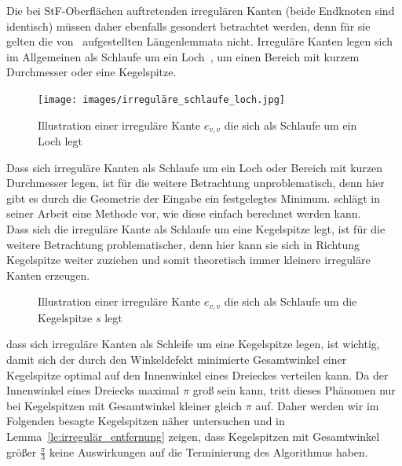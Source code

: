 Die bei StF-Oberflächen auftretenden irregulären Kanten (beide Endknoten sind identisch) müssen daher ebenfalls gesondert betrachtet werden, denn für sie gelten die von~\citet{ruppert:1995:delaunay} aufgestellten Längenlemmata nicht. Irreguläre Kanten legen sich im Allgemeinen als Schlaufe um ein Loch~\citeauthor{erickson:2005:generator}, um einen Bereich mit kurzem Durchmesser oder eine Kegelspitze.\\
 \begin{figure}[H]
    \centering
    \texttt{[image: images/irreguläre\_schlaufe\_loch.jpg]}
    \caption{Illustration einer  irreguläre Kante $e_{v,v}$ die sich als Schlaufe um ein Loch legt }%
    \label{fig:irreguläre_schlaufe}
\end{figure}
 


Dass sich irreguläre Kanten als Schlaufe um ein Loch oder Bereich mit kurzen Durchmesser legen, ist für die weitere Betrachtung unproblematisch, denn hier gibt es durch die Geometrie der Eingabe ein festgelegtes Minimum.  \citet{erickson:2005:generator}  schlägt in seiner Arbeit eine Methode vor, wie diese einfach berechnet werden kann.\\
Dass sich die irreguläre Kante als Schlaufe um eine Kegelspitze legt, ist für die weitere Betrachtung problematischer, denn hier kann sie sich in Richtung Kegelspitze  weiter zuziehen und somit theoretisch immer kleinere irreguläre Kanten erzeugen.
 \begin{figure}[H]
    \centering
    
    \caption{Illustration einer  irreguläre Kante $e_{v,v}$ die sich als Schlaufe um die Kegelspitze $s$ legt~\cite{erickson:2005:generator}}%
    \label{fig:irraegular_kegel}
\end{figure}
 
dass sich irreguläre Kanten als Schleife um eine Kegelspitze legen, ist wichtig, damit sich der durch den Winkeldefekt minimierte Gesamtwinkel einer Kegelspitze optimal auf den Innenwinkel eines Dreieckes verteilen kann. Da der Innenwinkel eines Dreiecks maximal $\pi$ groß sein kann, tritt dieses Phänomen nur bei Kegelspitzen mit Gesamtwinkel kleiner gleich $\pi$ auf. Daher werden wir im Folgenden besagte Kegelspitzen näher untersuchen und in Lemma~\ref{le:irregulär_entfernung} zeigen, dass Kegelspitzen mit Gesamtwinkel größer $\frac{\pi}{3}$ keine Auswirkungen auf die Terminierung des Algorithmus haben. 








